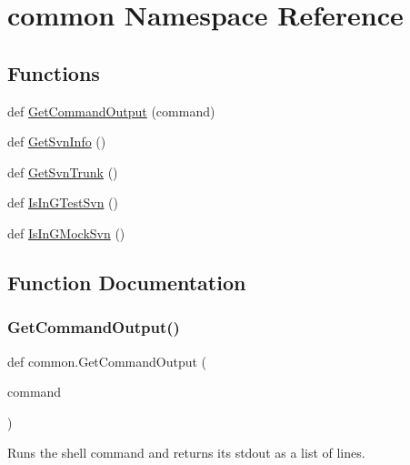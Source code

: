 \hypertarget{namespacecommon}{}\section{common Namespace Reference}
\label{namespacecommon}
\subsection*{Functions}
\begin{DoxyCompactItemize}
\item 
def \hyperlink{namespacecommon_ac1337758ae23f6a91b44de07408791da}{Get\+Command\+Output} (command)
\item 
def \hyperlink{namespacecommon_a312d07161b76d965fee6a61e464e283f}{Get\+Svn\+Info} ()
\item 
def \hyperlink{namespacecommon_a9e6483972a8dc0a6a274cbcee69564b0}{Get\+Svn\+Trunk} ()
\item 
def \hyperlink{namespacecommon_af29dcab2d7b4a9dd846446a0987ab387}{Is\+In\+G\+Test\+Svn} ()
\item 
def \hyperlink{namespacecommon_a8219bb529336fc3f0ef8222a5ed48222}{Is\+In\+G\+Mock\+Svn} ()
\end{DoxyCompactItemize}


\subsection{Function Documentation}
\mbox{\label{namespacecommon_ac1337758ae23f6a91b44de07408791da}} 
\subsubsection{\texorpdfstring{Get\+Command\+Output()}{GetCommandOutput()}}
{\footnotesize\ttfamily def common.\+Get\+Command\+Output (\begin{DoxyParamCaption}\item[{}]{command }\end{DoxyParamCaption})}

\begin{DoxyVerb}Runs the shell command and returns its stdout as a list of lines.\end{DoxyVerb}
 \mbox{\label{namespacecommon_a312d07161b76d965fee6a61e464e283f}} 
